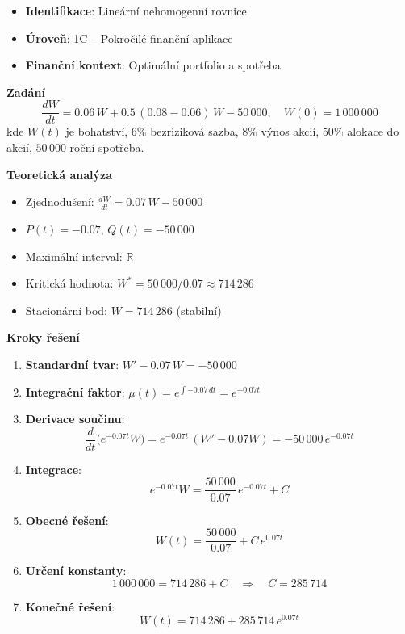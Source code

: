 \begin{example}
\label{ex:merton-model}

\begin{itemize}
\item \textbf{Identifikace}: Lineární nehomogenní rovnice
\item \textbf{Úroveň}: 1C -- Pokročilé finanční aplikace
\item \textbf{Finanční kontext}: Optimální portfolio a spotřeba
\end{itemize}

\noindent\textbf{Zadání}
\[
\frac{dW}{dt} = 0.06\,W + 0.5\,(0.08 - 0.06)\,W - 50\,000, \quad W(0) = 1\,000\,000
\]
kde $W(t)$ je bohatství, $6\%$ bezriziková sazba, $8\%$ výnos akcií, $50\%$ alokace do akcií, $50\,000$ roční spotřeba.

\noindent\textbf{Teoretická analýza}
\begin{itemize}
\item Zjednodušení: $\displaystyle \frac{dW}{dt} = 0.07\,W - 50\,000$
\item $P(t) = -0.07$, $Q(t) = -50\,000$
\item Maximální interval: $\mathbb{R}$
\item Kritická hodnota: $W^* = 50\,000/0.07 \approx 714\,286$
\item Stacionární bod: $W = 714\,286$ (stabilní)
\end{itemize}

\noindent\textbf{Kroky řešení}
\begin{enumerate}
\item \textbf{Standardní tvar}: $W' - 0.07\,W = -50\,000$
\item \textbf{Integrační faktor}: $\mu(t) = e^{\int -0.07\, dt} = e^{-0.07t}$
\item \textbf{Derivace součinu}:
\[
\frac{d}{dt}\!\bigl(e^{-0.07t}W\bigr) = e^{-0.07t}\,(W' - 0.07W) = -50\,000\, e^{-0.07t}
\]
\item \textbf{Integrace}:
\[
e^{-0.07t}W = \frac{50\,000}{0.07}\, e^{-0.07t} + C
\]
\item \textbf{Obecné řešení}:
\[
W(t) = \frac{50\,000}{0.07} + C\, e^{0.07t}
\]
\item \textbf{Určení konstanty}:
\[
1\,000\,000 = 714\,286 + C \quad\Rightarrow\quad C = 285\,714
\]
\item \textbf{Konečné řešení}:
\[
W(t) = 714\,286 + 285\,714\, e^{0.07t}
\]
\end{enumerate}


\end{example}
